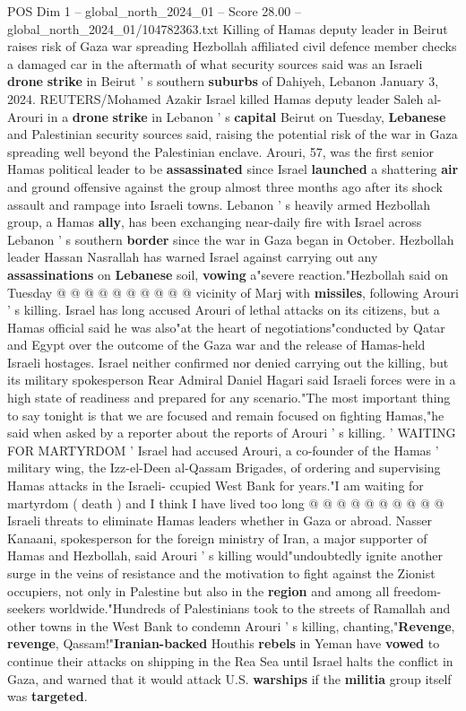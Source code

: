 \begin{textsample}{POS Dim 1 – global\_north\_2024\_01 – Score 28.00 – global\_north\_2024\_01/104782363.txt}  \label{ex:f1_pos_124}
Killing of Hamas deputy leader in Beirut raises risk of Gaza war spreading Hezbollah affiliated civil defence member checks a damaged car in the aftermath of what security sources said was an Israeli \textbf{drone} \textbf{strike} in Beirut ' s southern \textbf{suburbs} of Dahiyeh, Lebanon January 3, 2024.
REUTERS/Mohamed Azakir Israel killed Hamas deputy leader Saleh al-Arouri in a \textbf{drone} \textbf{strike} in Lebanon ' s \textbf{capital} Beirut on Tuesday, \textbf{Lebanese} and Palestinian security sources said, raising the potential risk of the war in Gaza spreading well beyond the Palestinian enclave.
Arouri, 57, was the first senior Hamas political leader to be \textbf{assassinated} since Israel \textbf{launched} a shattering \textbf{air} and ground offensive against the group almost three months ago after its shock assault and rampage into Israeli towns.
Lebanon ' s heavily armed Hezbollah group, a Hamas \textbf{ally}, has been exchanging near-daily fire with Israel across Lebanon ' s southern \textbf{border} since the war in Gaza began in October.
Hezbollah leader Hassan Nasrallah has warned Israel against carrying out any \textbf{assassinations} on \textbf{Lebanese} soil, \textbf{vowing} a"severe reaction."Hezbollah said on Tuesday @ @ @ @ @ @ @ @ @ @ vicinity of Marj with \textbf{missiles}, following Arouri ' s killing.
Israel has long accused Arouri of lethal attacks on its citizens, but a Hamas official said he was also"at the heart of negotiations"conducted by Qatar and Egypt over the outcome of the Gaza war and the release of Hamas-held Israeli hostages.
Israel neither confirmed nor denied carrying out the killing, but its military spokesperson Rear Admiral Daniel Hagari said Israeli forces were in a high state of readiness and prepared for any scenario."The most important thing to say tonight is that we are focused and remain focused on fighting Hamas,"he said when asked by a reporter about the reports of Arouri ' s killing. ' WAITING FOR MARTYRDOM ' Israel had accused Arouri, a co-founder of the Hamas ' military wing, the Izz-el-Deen al-Qassam Brigades, of ordering and supervising Hamas attacks in the Israeli- ccupied West Bank for years."I am waiting for martyrdom ( death ) and I think I have lived too long @ @ @ @ @ @ @ @ @ @ Israeli threats to eliminate Hamas leaders whether in Gaza or abroad.
Nasser Kanaani, spokesperson for the foreign ministry of Iran, a major supporter of Hamas and Hezbollah, said Arouri ' s killing would"undoubtedly ignite another surge in the veins of resistance and the motivation to fight against the Zionist occupiers, not only in Palestine but also in the \textbf{region} and among all freedom-seekers worldwide."Hundreds of Palestinians took to the streets of Ramallah and other towns in the West Bank to condemn Arouri ' s killing, chanting,"\textbf{Revenge}, \textbf{revenge}, Qassam!"\textbf{Iranian-backed} Houthis \textbf{rebels} in Yeman have \textbf{vowed} to continue their attacks on shipping in the Rea Sea until Israel halts the conflict in Gaza, and warned that it would attack U.S. \textbf{warships} if the \textbf{militia} group itself was \textbf{targeted}.

\end{textsample}
